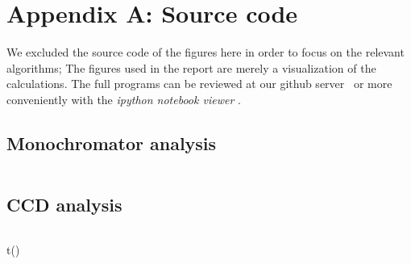 \section{Appendix A: Source code}
We excluded the source code of the figures here in order to focus on the relevant algorithms; 
The figures used in the report are merely a visualization of the calculations. The full programs can
be reviewed at our github server~\cite{FPII_Z0} or more conveniently with the \textit{ipython notebook viewer} 
\cite{notebook_viewer}.
\subsection{Monochromator analysis}
\label{sub:mono_code}
\inputminted{python}{analysis/mono.py}    
\subsection{CCD analysis}
\label{sub:ccd_code}
\inputminted{python}{analysis/ccd.py}  t()

